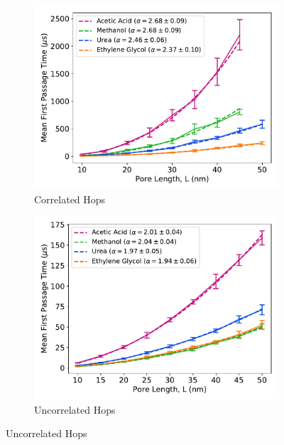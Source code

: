 \documentclass{article}
\begin{document}
  \begin{figure}
  \centering
  \begin{subfigure}{0.325\textwidth}
  \includegraphics[width=\textwidth]{mfpt_curves.pdf}
  \caption{Correlated Hops}\label{fig:mfpt_curves_regular}
  \end{subfigure}
  \begin{subfigure}{0.325\textwidth}
  \includegraphics[width=\textwidth]{mfpt_curves_brownian.pdf}
  \caption{Uncorrelated Hops}\label{fig:mfpt_curves_brownian}

\end{subfigure}
\end{figure}
\end{document}
